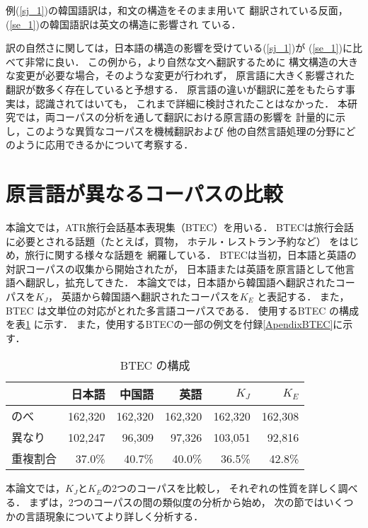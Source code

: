 例(\ref{sj_1})の韓国語訳は，和文の構造をそのまま用いて
翻訳されている反面，(\ref{se_1})の韓国語訳は英文の構造に影響され
ている．

訳の自然さに関しては，日本語の構造の影響を受けている(\ref{sj_1})が
(\ref{se_1})に比べて非常に良い．
この例から，より自然な文へ翻訳するために
構文構造の大きな変更が必要な場合，そのような変更が行われず，
原言語に大きく影響された翻訳が数多く存在していると予想する．
原言語の違いが翻訳に差をもたらす事実は，認識されてはいても，
これまで詳細に検討されたことはなかった．
本研究では，両コーパスの分析を通して翻訳における原言語の影響を
計量的に示し，このような異質なコーパスを機械翻訳および
他の自然言語処理の分野にどのように応用できるかについて考察する．


\section{原言語が異なるコーパスの比較}
\label{sec:compare}

本論文では，ATR旅行会話基本表現集（BTEC）を用いる．
BTECは旅行会話に必要とされる話題（たとえば，買物，
ホテル・レストラン予約など）
をはじめ，旅行に関する様々な話題を
網羅している\cite{Takezawa:Shirai:Ooyama:2001}．
BTECは当初，日本語と英語の対訳コーパスの収集から開始されたが，
日本語または英語を原言語として他言語へ翻訳し，拡充してきた．
本論文では，日本語から韓国語へ翻訳されたコーパスを$K_J$，
英語から韓国語へ翻訳されたコーパスを$K_E$ と表記する．
また，BTEC は文単位の対応がとれた多言語コーパスである．
使用するBTEC の構成を表\ref{tab:btec} に示す．
また，使用するBTECの一部の例文を付録\ref{ApendixBTEC}に示す．

\begin{table}[htb]
\begin{center}
\caption{BTEC の構成}
\label{tab:btec}
\begin{tabular}{l|r|r|r|r|r}
\hline \hline 
            & 日本語 & 中国語 & 英語 & $K_J$ & $K_E$    \\ \hline
のべ  &  162,320  &  162,320 &  162,320   & 162,320    &  162,308     \\
異なり  & 102,247    &  96,309 &  97,326    & 103,051     & 92,816 \\
重複割合  &  37.0\% & 40.7\%  &  40.0\%   & 36.5\%    &   42.8\%\\
\hline\hline 
\end{tabular}
\end{center}
\end{table}

本論文では，$K_J$と$K_E$の2つのコーパスを比較し，
それぞれの性質を詳しく調べる．
まずは，2つのコーパスの間の類似度の分析から始め，
次の節ではいくつかの言語現象についてより詳しく分析する．


